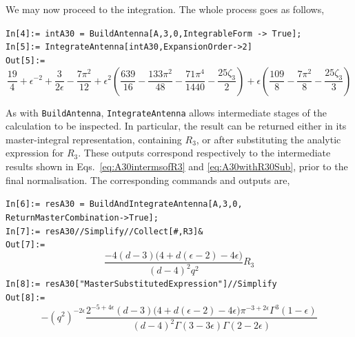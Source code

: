 We may now proceed to the integration. The whole process goes as follows,

\begin{mdframed}[backgroundcolor=gray!10, linewidth=0pt]
    \texttt{In[4]:= intA30 = BuildAntenna[A,3,0,IntegrableForm -> True];}\\
    \hfill
    \texttt{In[5]:= IntegrateAntenna[intA30,ExpansionOrder->2]}\\
    \hfill
    \texttt{Out[5]:=}
        \begin{equation*}
            \frac{19}{4}+\epsilon^{-2}+\frac3{2\epsilon}-\frac{7\pi^2}{12}+\epsilon^2\left(\frac{639}{16}-\frac{133\pi^2}{48}-\frac{71\pi^4}{1440}-\frac{25\zeta_3}{2}\right)+\epsilon\left(\frac{109}{8}-\frac{7\pi^2}{8}-\frac{25\zeta_3}{3}\right)
        \end{equation*}
\end{mdframed}

As with \texttt{BuildAntenna}, \texttt{IntegrateAntenna} allows intermediate stages of the calculation
to be inspected. In particular, the result can be returned either in its master-integral
representation, containing $R_3$, or after substituting the analytic expression for $R_3$. These
outputs correspond respectively to the intermediate results shown in
Eqs.~\eqref{eq:A30intermsofR3} and \eqref{eq:A30withR30Sub}, prior to the final normalisation. The
corresponding commands and outputs are,

\begin{mdframed}[backgroundcolor=gray!10, linewidth=0pt]
    \texttt{In[6]:= resA30 = BuildAndIntegrateAntenna[A,3,0,\\ReturnMasterCombination->True];}\\
    \hfill
    \texttt{In[7]:= resA30//Simplify//Collect[\#,R3]\&}\\
    \hfill
    \texttt{Out[7]:=}
        \begin{equation*}
            \frac{-4(d-3)\big(4+d(\epsilon-2)-4\epsilon\big)}{(d-4)^2q^2}R_3
        \end{equation*}
    \texttt{In[8]:= resA30["MasterSubstitutedExpression"]//Simplify}\\
    \hfill
    \texttt{Out[8]:=}
        \begin{equation*}
            -\left(q^2\right)^{-2\epsilon}\frac{2^{-5+4\epsilon}(d-3)\big(4+d(\epsilon-2)-4\epsilon\big)\pi^{-3+2\epsilon}\Gamma^3(1-\epsilon)}{(d-4)^2\Gamma(3-3\epsilon)\Gamma(2-2\epsilon)}
        \end{equation*}
\end{mdframed}

